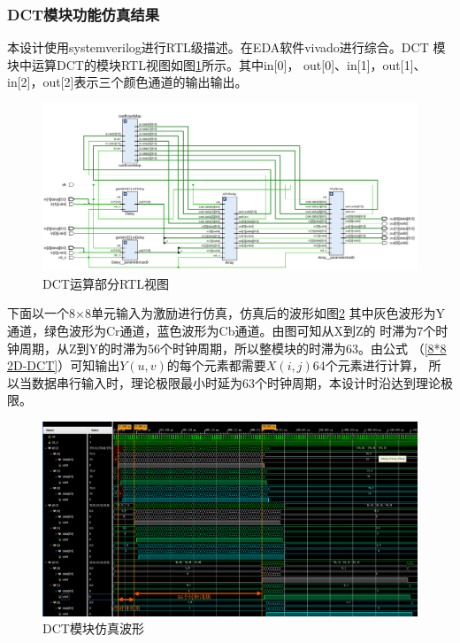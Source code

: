 \documentclass{article}
\numberwithin {equation}{section}
\begin{document}
\begin{spacing}{1.25}
        \subsubsection{DCT模块功能仿真结果}
        \vspace{1em}
        本设计使用systemverilog进行RTL级描述。在EDA软件vivado进行综合。DCT
        模块中运算DCT的模块RTL视图如图\ref{DCTSchematice}所示。其中in[0]，
        out[0]、in[1]，out[1]、in[2]，out[2]表示三个颜色通道的输出输出。
        \begin{figure}[H]
          \centering
          \includegraphics[scale=0.5]{./pictures/DCTSchematice.png}
          \caption{DCT运算部分RTL视图}
          \label{DCTSchematice}
        \end{figure}
      下面以一个8×8单元输入为激励进行仿真，仿真后的波形如图\ref{DCTSimulationWave}
      其中灰色波形为Y通道，绿色波形为Cr通道，蓝色波形为Cb通道。由图可知从X到Z的
      时滞为7个时钟周期，从Z到Y的时滞为56个时钟周期，所以整模块的时滞为63。由公式
      （\ref{8*8 2D-DCT}）可知输出$Y(u,v)$的每个元素都需要$X(i,j)$64个元素进行计算，
      所以当数据串行输入时，理论极限最小时延为63个时钟周期，本设计时沿达到理论极限。
        \begin{figure}[H]
          \centering
          \includegraphics[scale=0.375]{./pictures/DCT模块仿真.png}
          \caption{DCT模块仿真波形}
          \label{DCTSimulationWave}
        \end{figure}


\end{spacing}
\end{document}
